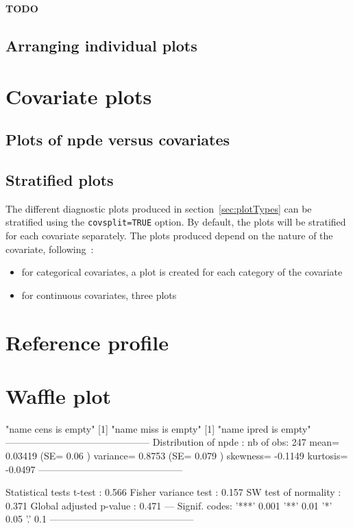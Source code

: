 \documentclass{article}
\begin{document}
{\bf TODO}

\subsection{Arranging individual plots}

\section{Covariate plots}

\subsection{Plots of {\bfseries npde} versus covariates}

\subsection{Stratified plots}

\hskip 18pt The different diagnostic plots produced in section~\ref{sec:plotTypes} can be stratified using the \verb+covsplit=TRUE+ option. By default, the plots will be stratified for each covariate separately. The plots produced depend on the nature of the covariate, following~\cite{Brendel10}:
\begin{itemize}
\item for categorical covariates, a plot is created for each category of the covariate
\item for continuous covariates, three plots 
\end{itemize}

\section{Reference profile}

\section{Waffle plot}


\begin{Schunk}
\begin{Soutput}
[1] "name cens is empty"
[1] "name miss is empty"
[1] "name ipred is empty"
---------------------------------------------
Distribution of npde :
      nb of obs: 247 
           mean= 0.03419   (SE= 0.06 )
       variance= 0.8753   (SE= 0.079 )
       skewness= -0.1149 
       kurtosis= -0.0497 
---------------------------------------------

Statistical tests
  t-test                     : 0.566
  Fisher variance test       : 0.157
  SW test of normality       : 0.371
Global adjusted p-value      : 0.471
---
Signif. codes: '***' 0.001 '**' 0.01 '*' 0.05 '.' 0.1 
---------------------------------------------
\end{Soutput}
\end{Schunk}
\end{document}
